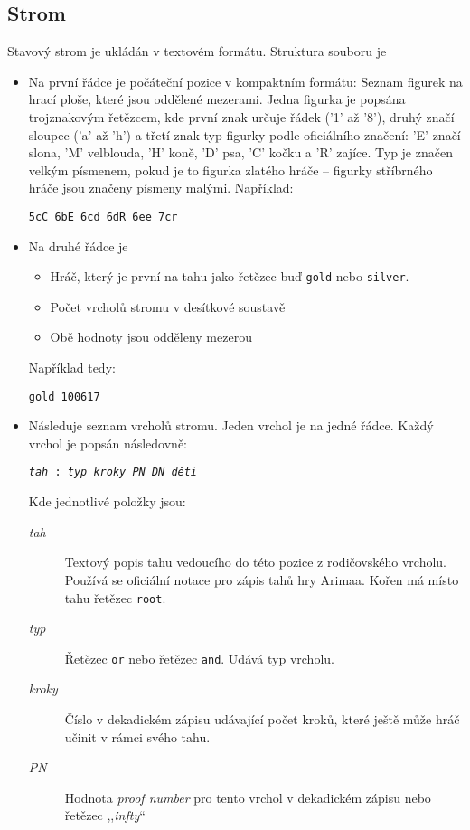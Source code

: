 \documentclass{article}
\begin{document}
\subsection{Strom}
Stavový strom je ukládán v textovém formátu. Struktura souboru je \begin{itemize}
  \item Na první řádce je počáteční pozice v kompaktním formátu: Seznam figurek na hrací ploše, které jsou oddělené
  mezerami. Jedna figurka je popsána trojznakovým řetězcem, kde první znak určuje řádek ('1' až '8'), druhý značí
  sloupec ('a' až 'h') a třetí znak typ figurky podle oficiálního značení: 'E' značí slona, 'M' velblouda, 'H' koně, 'D'
  psa, 'C' kočku a 'R' zajíce. Typ je značen velkým písmenem, pokud je to figurka zlatého hráče -- figurky stříbrného
  hráče jsou značeny písmeny malými. Například: \begin{center}\verb+5cC 6bE 6cd 6dR 6ee 7cr+\end{center}
  \item Na druhé řádce je \begin{itemize}
    \item Hráč, který je první na tahu jako řetězec buď \texttt{gold} nebo \texttt{silver}.
    \item Počet vrcholů stromu v desítkové soustavě
    \item Obě hodnoty jsou odděleny mezerou
  \end{itemize}
  Například tedy: \begin{center}\verb+gold 100617+\end{center}
  \item Následuje seznam vrcholů stromu. Jeden vrchol je na jedné řádce. Každý vrchol je popsán
  následovně: \begin{center}\texttt{\textit{tah} : \textit{typ} \textit{kroky} \textit{PN}
  \textit{DN} \textit{děti}}\end{center}
  Kde jednotlivé položky jsou:\begin{description}
	  \item[\textit{tah}] Textový popis tahu vedoucího do této pozice z rodičovského vrcholu. Používá se oficiální notace pro 
        zápis tahů hry Arimaa. Kořen má místo tahu řetězec \texttt{root}.
	  \item[\textit{typ}] Řetězec \texttt{or} nebo řetězec \texttt{and}. Udává typ vrcholu.
	  \item[\textit{kroky}] Číslo v dekadickém zápisu udávající počet kroků, které ještě může hráč učinit v rámci svého
	  tahu.
	  \item[\textit{PN}] Hodnota \emph{proof number} pro tento vrchol v dekadickém zápisu nebo řetězec ,,\textit{infty}``

\end{description}
\end{itemize}
\end{document}
